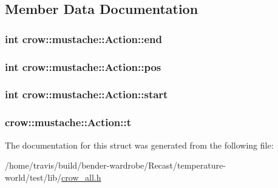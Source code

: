 \subsection{Member Data Documentation}
\hypertarget{structcrow_1_1mustache_1_1_action_ac0daea6290bb2ca9c9c87c3fb163ce7d}{
\subsubsection[{end}]{\setlength{\rightskip}{0pt plus 5cm}int crow\-::mustache\-::\-Action\-::end}}\label{structcrow_1_1mustache_1_1_action_ac0daea6290bb2ca9c9c87c3fb163ce7d}
\hypertarget{structcrow_1_1mustache_1_1_action_a1af3f38c04cdc0978c2a788eeda81eab}{
\subsubsection[{pos}]{\setlength{\rightskip}{0pt plus 5cm}int crow\-::mustache\-::\-Action\-::pos}}\label{structcrow_1_1mustache_1_1_action_a1af3f38c04cdc0978c2a788eeda81eab}
\hypertarget{structcrow_1_1mustache_1_1_action_a643c89b2d81bfc2d2eedfca0cb119068}{
\subsubsection[{start}]{\setlength{\rightskip}{0pt plus 5cm}int crow\-::mustache\-::\-Action\-::start}}\label{structcrow_1_1mustache_1_1_action_a643c89b2d81bfc2d2eedfca0cb119068}
\hypertarget{structcrow_1_1mustache_1_1_action_aed7c3e6311655c446b56c31210e27ff4}{
\subsubsection[{t}]{ crow\-::mustache\-::\-Action\-::t}}\label{structcrow_1_1mustache_1_1_action_aed7c3e6311655c446b56c31210e27ff4}


The documentation for this struct was generated from the following file\-:\begin{DoxyCompactItemize}
\item 
/home/travis/build/bender-\/wardrobe/\-Recast/temperature-\/world/test/lib/\hyperlink{crow__all_8h}{crow\-\_\-all.\-h}\end{DoxyCompactItemize}
